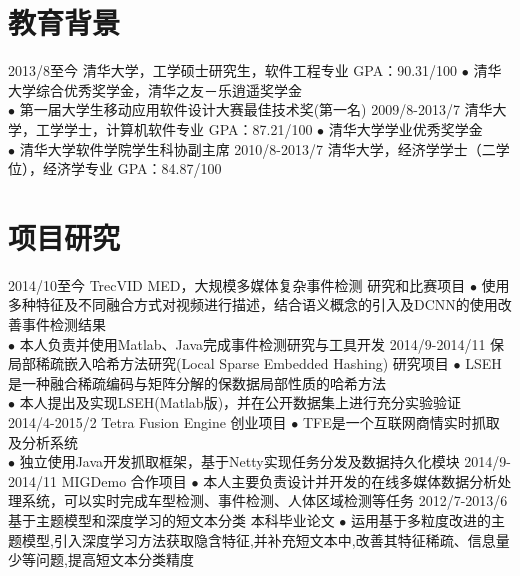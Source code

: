 \documentclass[]{friggeri-cv-cn}
\begin{document}


\section{教育背景}

\begin{entrylist}
  \entry
    {2013/8至今}
    {清华大学，工学硕士研究生，软件工程专业}
    {GPA：90.31/100}
    {
    $\bullet$ 清华大学综合优秀奖学金，清华之友－乐逍遥奖学金 \\
    $\bullet$ 第一届大学生移动应用软件设计大赛最佳技术奖(第一名)
    }
  \entry
    {2009/8-2013/7}
    {清华大学，工学学士，计算机软件专业}
    {GPA：87.21/100}
    {
    $\bullet$ 清华大学学业优秀奖学金\\
    $\bullet$ 清华大学软件学院学生科协副主席
    }
  \entry
    {2010/8-2013/7}
    {清华大学，经济学学士（二学位），经济学专业}
    {GPA：84.87/100}
    {}
\end{entrylist}

\section{项目研究}

\begin{entrylist}
  \entry
    {2014/10至今}
    {TrecVID MED，大规模多媒体复杂事件检测}
    {研究和比赛项目}
    {$\bullet$ 使用多种特征及不同融合方式对视频进行描述，结合语义概念的引入及DCNN的使用改善事件检测结果\\
    $\bullet$ 本人负责并使用Matlab、Java完成事件检测研究与工具开发}
  \entry
    {2014/9-2014/11}
    {保局部稀疏嵌入哈希方法研究(Local Sparse Embedded Hashing)}
    {研究项目}
    {$\bullet$ LSEH是一种融合稀疏编码与矩阵分解的保数据局部性质的哈希方法\\
    $\bullet$ 本人提出及实现LSEH(Matlab版)，并在公开数据集上进行充分实验验证}
  \entry
    {2014/4-2015/2}
    {Tetra Fusion Engine}
    {创业项目}
    {$\bullet$ TFE是一个互联网商情实时抓取及分析系统\\
    $\bullet$ 独立使用Java开发抓取框架，基于Netty实现任务分发及数据持久化模块}
  \entry
    {2014/9-2014/11}
    {MIGDemo}
    {合作项目}
    {$\bullet$ 本人主要负责设计并开发的在线多媒体数据分析处理系统，可以实时完成车型检测、事件检测、人体区域检测等任务}
  \entry
    {2012/7-2013/6}
    {基于主题模型和深度学习的短文本分类}
    {本科毕业论文}
    {$\bullet$ 运用基于多粒度改进的主题模型,引入深度学习方法获取隐含特征,并补充短文本中,改善其特征稀疏、信息量少等问题,提高短文本分类精度}
\end{entrylist}
\end{document}
